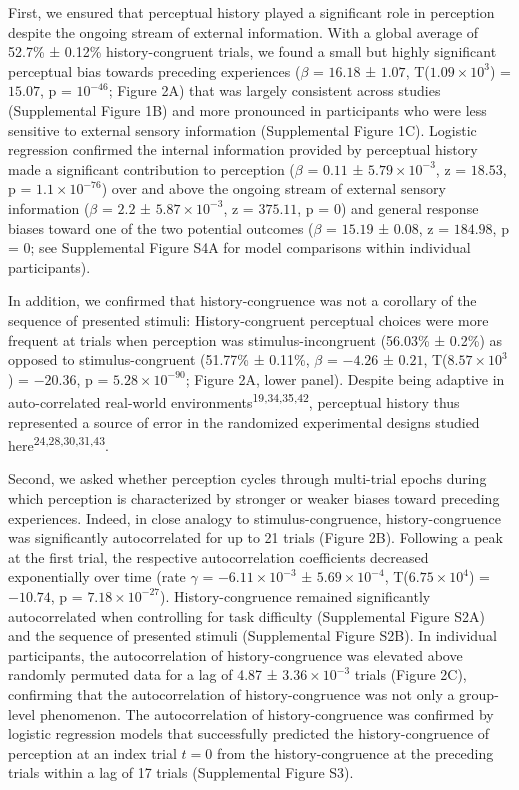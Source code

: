 \documentclass[
]{article}
\begin{document}
First, we ensured that perceptual history played a significant role in
perception despite the ongoing stream of external information. With a
global average of 52.7\% ± 0.12\% history-congruent trials, we found a
small but highly significant perceptual bias towards preceding
experiences (\(\beta\) = \(16.18\) ± \(1.07\),
T(\(\ensuremath{1.09\times 10^{3}}\)) = \(15.07\), p =
\(\ensuremath{10^{-46}}\); Figure 2A) that was largely consistent across
studies (Supplemental Figure 1B) and more pronounced in participants who
were less sensitive to external sensory information (Supplemental Figure
1C). Logistic regression confirmed the internal information provided by
perceptual history made a significant contribution to perception
(\(\beta\) = \(0.11\) ± \(\ensuremath{5.79\times 10^{-3}}\), z =
\(18.53\), p = \(\ensuremath{1.1\times 10^{-76}}\)) over and above the
ongoing stream of external sensory information (\(\beta\) = \(2.2\) ±
\(\ensuremath{5.87\times 10^{-3}}\), z = \(375.11\), p = \(0\)) and
general response biases toward one of the two potential outcomes
(\(\beta\) = \(15.19\) ± \(0.08\), z = \(184.98\), p = \(0\); see
Supplemental Figure S4A for model comparisons within individual
participants).

In addition, we confirmed that history-congruence was not a corollary of
the sequence of presented stimuli: History-congruent perceptual choices
were more frequent at trials when perception was stimulus-incongruent
(56.03\% ± 0.2\%) as opposed to stimulus-congruent (51.77\% ± 0.11\%,
\(\beta\) = \(-4.26\) ± \(0.21\), T(\(\ensuremath{8.57\times 10^{3}}\))
= \(-20.36\), p = \(\ensuremath{5.28\times 10^{-90}}\); Figure 2A, lower
panel). Despite being adaptive in auto-correlated real-world
environments\textsuperscript{19,34,35,42}, perceptual history thus
represented a source of error in the randomized experimental designs
studied here\textsuperscript{24,28,30,31,43}.

Second, we asked whether perception cycles through multi-trial epochs
during which perception is characterized by stronger or weaker biases
toward preceding experiences. Indeed, in close analogy to
stimulus-congruence, history-congruence was significantly autocorrelated
for up to 21 trials (Figure 2B). Following a peak at the first trial,
the respective autocorrelation coefficients decreased exponentially over
time (rate \(\gamma\) = \(\ensuremath{-6.11\times 10^{-3}}\) ±
\(\ensuremath{5.69\times 10^{-4}}\),
T(\(\ensuremath{6.75\times 10^{4}}\)) = \(-10.74\), p =
\(\ensuremath{7.18\times 10^{-27}}\)). History-congruence remained
significantly autocorrelated when controlling for task difficulty
(Supplemental Figure S2A) and the sequence of presented stimuli
(Supplemental Figure S2B). In individual participants, the
autocorrelation of history-congruence was elevated above randomly
permuted data for a lag of 4.87 ± \ensuremath{3.36\times 10^{-3}} trials
(Figure 2C), confirming that the autocorrelation of history-congruence
was not only a group-level phenomenon. The autocorrelation of
history-congruence was confirmed by logistic regression models that
successfully predicted the history-congruence of perception at an index
trial \(t = 0\) from the history-congruence at the preceding trials
within a lag of 17 trials (Supplemental Figure S3).
\end{document}

